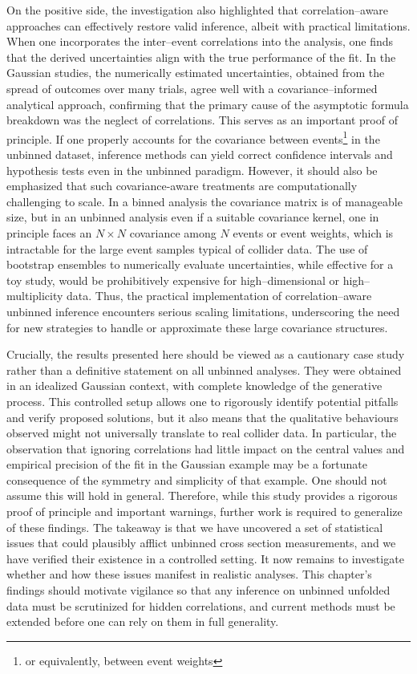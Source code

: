     On the positive side, the investigation also highlighted that correlation--aware approaches can effectively restore valid inference, albeit with practical limitations.
    When one incorporates the inter--event correlations into the analysis, one finds that the derived uncertainties align with the true performance of the fit.
    In the Gaussian studies, the numerically estimated uncertainties, obtained from the spread of outcomes over many trials, agree well with a covariance--informed analytical approach, confirming that the primary cause of the asymptotic formula breakdown was the neglect of correlations.
    This serves as an important proof of principle.
    If one properly accounts for the covariance between events\footnote{or equivalently, between event weights} in the unbinned dataset, inference methods can yield correct confidence intervals and hypothesis tests even in the unbinned paradigm.
    However, it should also be emphasized that such covariance-aware treatments are computationally challenging to scale.
    In a binned analysis the covariance matrix is of manageable size, but in an unbinned analysis even if a suitable covariance kernel, one in principle faces an $N \times N$ covariance among $N$ events or event weights, which is intractable for the large event samples typical of collider data.
    The use of bootstrap ensembles to numerically evaluate uncertainties, while effective for a toy study, would be prohibitively expensive for high--dimensional or high--multiplicity data.
    Thus, the practical implementation of correlation--aware unbinned inference encounters serious scaling limitations, underscoring the need for new strategies to handle or approximate these large covariance structures.

    Crucially, the results presented here should be viewed as a cautionary case study rather than a definitive statement on all unbinned analyses. 
    They were obtained in an idealized Gaussian context, with complete knowledge of the generative process.
    This controlled setup allows one to rigorously identify potential pitfalls and verify proposed solutions, but it also means that the qualitative behaviours observed might not universally translate to real collider data.
    In particular, the observation that ignoring correlations had little impact on the central values and empirical precision of the fit in the Gaussian example may be a fortunate consequence of the symmetry and simplicity of that example.
    One should not assume this will hold in general.
    Therefore, while this study provides a rigorous proof of principle and important warnings, further work is required to generalize of these findings.
    The takeaway is that we have uncovered a set of statistical issues that could plausibly afflict unbinned cross section measurements, and we have verified their existence in a controlled setting.
    It now remains to investigate whether and how these issues manifest in realistic analyses.
    This chapter’s findings should motivate vigilance so that any inference on unbinned unfolded data must be scrutinized for hidden correlations, and current methods must be extended before one can rely on them in full generality.

